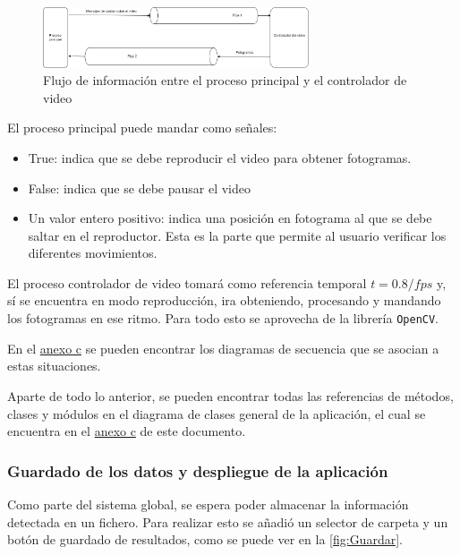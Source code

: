 \begin{enumerate}
    \begin{figure}[H]
        \centering
        \includegraphics[width=0.7\textwidth]{images/6/6.5/Procesos2.png}
        \caption{Flujo de información entre el proceso principal y el controlador de video}
        \label{fig:DatosVideo}
    \end{figure}

    El proceso principal puede mandar como señales:
    \begin{itemize}
        \item True: indica que se debe reproducir el video para obtener fotogramas.
        \item False: indica que se debe pausar el video
        \item Un valor entero positivo: indica una posición en fotograma al que se debe saltar en el reproductor. Esta es la parte que permite al usuario verificar los diferentes movimientos.
    \end{itemize}
    El proceso controlador de video tomará como referencia temporal $ t = 0.8/fps $ y, sí se encuentra en modo reproducción, ira obteniendo, procesando y mandando los fotogramas en ese ritmo. Para todo 
    esto se aprovecha de la librería \texttt{OpenCV}.
    
    En el \hyperref[esquema:SecuenciaResto]{anexo c} se pueden encontrar los diagramas de secuencia que se asocian a estas situaciones.
\end{enumerate}

\vspace{2\baselineskip}

Aparte de todo lo anterior, se pueden encontrar todas las referencias de métodos, clases y módulos en el diagrama de clases general de la aplicación, el cual se encuentra en el 
\hyperref[esquema:DiagramaClases]{anexo c} de este documento.

\clearpage
\subsubsection{Guardado de los datos y despliegue de la aplicación}

Como parte del sistema global, se espera poder almacenar la información detectada en un fichero. Para realizar esto se añadió un selector de carpeta y un botón de guardado de resultados, como se puede 
ver en la \autoref{fig:Guardar}.

